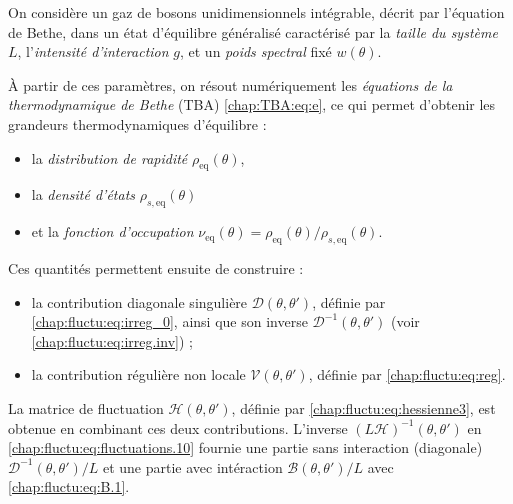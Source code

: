 On considère un gaz de bosons unidimensionnels intégrable, décrit par l'équation de Bethe, dans un état d'équilibre généralisé caractérisé par la {\em taille du système} \(L\), l'{\em intensité d'interaction} \(g\), et un {\em poids spectral} fixé \(w(\theta)\).

À partir de ces paramètres, on résout numériquement les {\em équations de la thermodynamique de Bethe} (TBA) \eqref{chap:TBA:eq:e}, ce qui permet d'obtenir les grandeurs thermodynamiques d'équilibre :
\begin{itemize}[label = $\bullet$]
	\item la {\em distribution de rapidité} \( \rho_{\mathrm{eq}}(\theta) \),
	\item la {\em densité d'états} \( \rho_{s,\mathrm{eq}}(\theta) \)
	\item et la {\em fonction d'occupation} \( \nu_{\! \mathrm{eq}}(\theta) = \rho_{\! \mathrm{eq}}(\theta) / \rho_{\! s,\mathrm{eq}}(\theta) \).
\end{itemize}


Ces quantités permettent ensuite de construire :
\begin{itemize}[label = $\bullet$]
	\item la contribution diagonale singulière \( \mathcal{D}(\theta, \theta') \), définie par \eqref{chap:fluctu:eq:irreg_0}, ainsi que son inverse \( \mathcal{D}^{-1}(\theta, \theta') \) (voir \eqref{chap:fluctu:eq:irreg.inv}) ;	
	\item la contribution régulière non locale \( \mathcal{V}(\theta, \theta') \), définie par \eqref{chap:fluctu:eq:reg}.
\end{itemize}

La matrice de fluctuation \( \mathcal{H}(\theta, \theta') \), définie par \eqref{chap:fluctu:eq:hessienne3}, est obtenue en combinant ces deux contributions. L’inverse \( \left(L \mathcal{H} \right)^{-1}(\theta, \theta') \) en \eqref{chap:fluctu:eq:fluctuations.10} fournie une partie sans interaction (diagonale) $\mathcal{D}^{-1}(\theta, \theta')/L$ et une partie avec intéraction $\mathcal{B}(\theta, \theta')/L$ avec \eqref{chap:fluctu:eq:B.1}.


%

